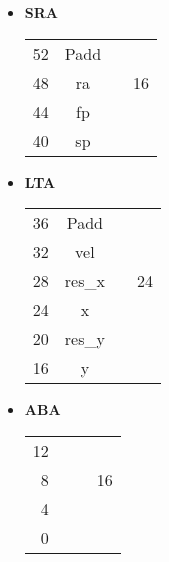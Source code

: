 \documentclass[a4paper,10pt]{article}
\begin{document}
\begin{itemize}
\item \textbf{SRA}
\begin{center}
\begin{tabular}{ r | c | c | l }
  \cline{2-2}                       
  52 & Padd& & \\ \cline{2-2}
  48 & ra & &  16 \\ \cline{2-2}
  44 & fp& & \\ \cline{2-2}
  40 & sp & &\\
  \cline{2-2}
\end{tabular}
\end{center}

\item \textbf{LTA}
\begin{center}
\begin{tabular}{ r | c | c | l }
  \cline{2-2}                       
  36 &Padd& & \\ \cline{2-2}
  32 & vel & &   \\ \cline{2-2}
  28 & res\_x & & 24 \\ \cline{2-2}
  24 & x & &\\ \cline{2-2}
  20 & res\_y & & \\ \cline{2-2}
  16 & y & &\\
  \cline{2-2}
\end{tabular}
\end{center}

\item \textbf{ABA}
\begin{center}
\begin{tabular}{ r | p{1cm} | c | l }
  \cline{2-2}                       
  12 &  & & \\ \cline{2-2}
  8 &   & &  16 \\ \cline{2-2}
  4 &  & & \\ \cline{2-2}
  0 &   & &\\
  \cline{2-2}
\end{tabular}
\end{center}


\end{itemize}
\end{document}
